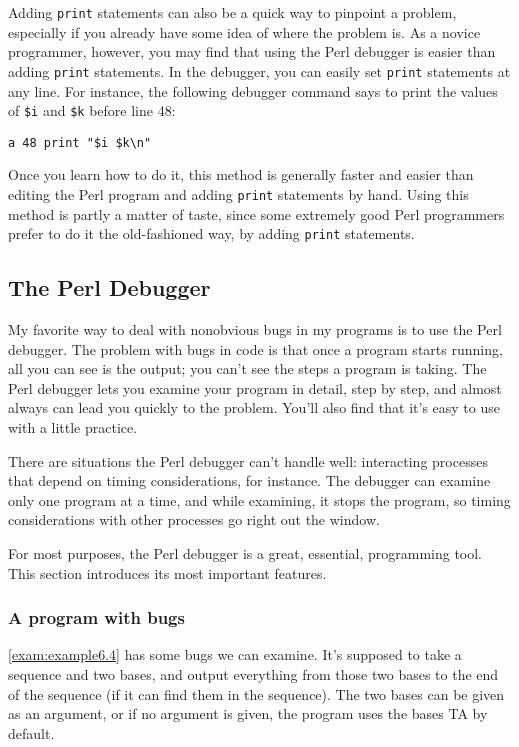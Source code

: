 Adding \verb|print| statements can also be a quick way to pinpoint a problem, especially if you already have some idea of where the problem is. As a novice programmer, however, you may find that using the Perl debugger is easier than adding \verb|print| statements. In the debugger, you can easily set \verb|print| statements at any line. For instance, the following debugger command says to print the values of \verb|$i| and \verb|$k| before line 48:

\begin{lstlisting}
a 48 print "$i $k\n"
\end{lstlisting}

Once you learn how to do it, this method is generally faster and easier than editing the Perl program and adding \verb|print| statements by hand. Using this method is partly a matter of taste, since some extremely good Perl programmers prefer to do it the old-fashioned way, by adding \verb|print| statements. 

\subsection{The Perl Debugger}
My favorite way to deal with nonobvious bugs in my programs is to use the Perl debugger. The problem with bugs in code is that once a program starts running, all you can see is the output; you can't see the steps a program is taking. The Perl debugger lets you examine your program in detail, step by step, and almost always can lead you quickly to the problem. You'll also find that it's easy to use with a little practice.

There are situations the Perl debugger can't handle well: interacting processes that depend on timing considerations, for instance. The debugger can examine only one program at a time, and while examining, it stops the program, so timing considerations with other processes go right out the window.

For most purposes, the Perl debugger is a great, essential, programming tool. This section introduces its most important features. 

\subsubsection{A program with bugs}
\autoref{exam:example6.4} has some bugs we can examine. It's supposed to take a sequence and two bases, and output everything from those two bases to the end of the sequence (if it can find them in the sequence). The two bases can be given as an argument, or if no argument is given, the program uses the bases TA by default.

